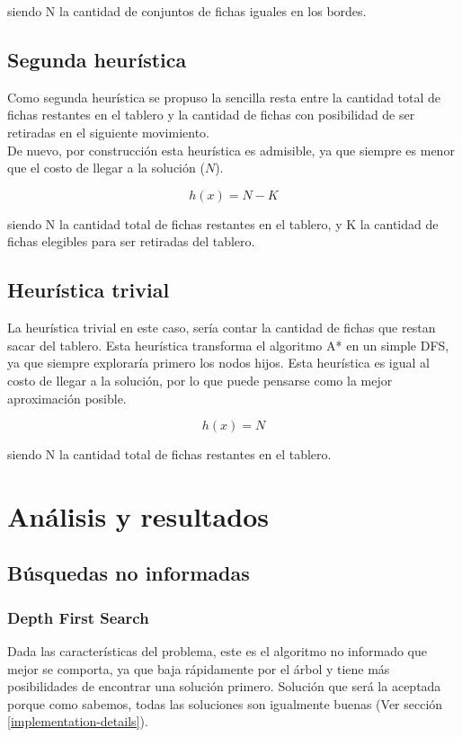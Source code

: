 \documentclass[a4paper,10pt]{article}
\begin{document}
    siendo N la cantidad de conjuntos de fichas iguales en los bordes.
    
    \subsection{Segunda heurística}

    Como segunda heurística se propuso la sencilla resta entre la cantidad total de fichas restantes en el tablero y la cantidad de fichas con posibilidad de ser retiradas en el
    siguiente movimiento.\\

    De nuevo, por construcción esta heurística es admisible, ya que siempre es menor que el costo de llegar a la solución ($N$).

     \[ h(x) = N - K\] 

    siendo N la cantidad total de fichas restantes en el tablero, y K la cantidad de fichas elegibles para ser retiradas del tablero.

    \subsection{Heurística trivial}

    La heurística trivial en este caso, sería contar la cantidad de fichas que restan sacar del tablero. Esta heurística transforma el algoritmo A* en un simple DFS, 
    ya que siempre exploraría primero los nodos hijos. Esta heurística es igual al costo de llegar a la solución, por lo que puede pensarse como la mejor aproximación posible.

    \[ h(x) = N \] 

    siendo N la cantidad total de fichas restantes en el tablero.

\section{Análisis y resultados}

\subsection{Búsquedas no informadas}

    \subsubsection{Depth First Search}
    \label{sec:dfs}
    Dada las características del problema, este es el algoritmo no informado que mejor se comporta, ya que baja rápidamente por el árbol y tiene más posibilidades de encontrar una solución primero.
    Solución que será la aceptada porque como sabemos, todas las soluciones son igualmente buenas (Ver sección \ref{implementation-details}).\\
\end{document}
